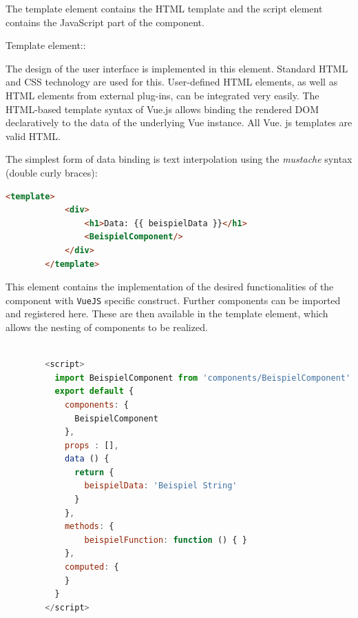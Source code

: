 The template element contains the HTML template and the script element contains the JavaScript part of the component.
\begin{labeling}{Template element::}
	\item [Template element:] The design of the user interface is implemented in this element. Standard HTML and CSS technology are used for this. User-defined HTML elements, as well as HTML elements from external plug-ins, can be integrated very easily. The HTML-based template syntax of Vue.js allows binding the rendered DOM declaratively to the data of the underlying Vue instance. All Vue. js templates are valid HTML.
	
	The simplest form of data binding is text interpolation using the \textit{mustache} syntax (double curly braces):
	\begin{lstlisting}[language=html,label={lst:label}, caption=Templateelement]
        <template>
            <div>
                <h1>Data: {{ beispielData }}</h1>
                <BeispielComponent/>
            </div>
        </template>    
        \end{lstlisting}
		\item [Script element:] This element contains the implementation of the desired functionalities of the component with \texttt{VueJS} specific construct. Further components can be imported and registered here. These are then available in the template element, which allows the nesting of components to be realized.
	\begin{lstlisting}[language=JavaScript,label={lst:label}, caption=Skriptelement]
        
        <script>
          import BeispielComponent from 'components/BeispielComponent'
          export default {
            components: {
              BeispielComponent
            },
            props : [],
            data () {
              return {
                beispielData: 'Beispiel String'
              }
            },
            methods: {
                beispielFunction: function () { }
            },
            computed: {
            }
          }
        </script>
        
        \end{lstlisting}
\end{labeling}


